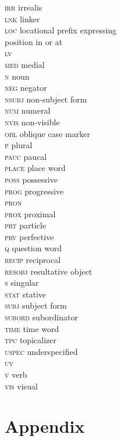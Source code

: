 \documentclass[output=paper
,modfonts
,nonflat]{langsci/langscibook}
\begin{document}
\begin{multicols}{2}
\begin{tabbing}
		\textsc{irr} \> irrealis\\
		\textsc{lnk} \> linker\\
		\textsc{loc} \> locational prefix expressing\\ \> position in or at\\
		\textsc{lv} \> \\
		\textsc{med} \> medial\\
		\textsc{n} \> noun\\
		\textsc{neg} \> negator\\
		\textsc{nsubj} \> non-subject form\\
		\textsc{num} \> numeral\\
		\textsc{nvis} \> non-visible\\
		\textsc{obl} \> oblique case marker\\
		\textsc{p} \> plural\\
		\textsc{pauc} \> paucal\\
		\textsc{place} \> place word\\
		\textsc{poss} \> possessive\\
		\textsc{prog} \> progressive\\
		\textsc{pron} \> \\ 
		\textsc{prox} \> proximal\\ 
		\textsc{prt} \> particle\\
		\textsc{prv} \> perfective\\
		\textsc{q} \> question word\\
		\textsc{recip} \> reciprocal\\
		\textsc{resobj} \> resultative object\\
		\textsc{s} \> singular\\
		\textsc{stat} \> stative\\
		\textsc{subj} \> subject form\\
		\textsc{subord} \> subordinator\\
		\textsc{time} \> time word\\
		\textsc{tpc} \> topicalizer\\
		\textsc{uspec} \> underspecified\\
		\textsc{uv} \> \\
		\textsc{v} \> verb\\
		\textsc{vis} \> visual
	\end{tabbing}
\end{multicols}

\section*{Appendix}
\end{document}
